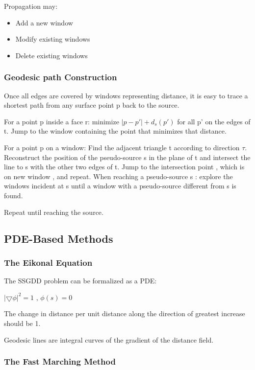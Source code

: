 \documentclass{article}
\begin{document}
Propagation may:

\begin{itemize}
    \item Add a new window
    \item Modify existing windows
    \item Delete existing windows
\end{itemize}

\subsubsection{Geodesic path Construction}

Once all edges are covered by windows representing distance, it is easy to trace a shortest path from any surface point p back to the source.

For a point p inside a face r: minimize $|p-p'| + d_s(p') $ for all p' on the edges of t. Jump to the window containing the point that minimizes that distance.

For a point p on a window: Find the adjacent triangle t according to direction $\tau$. Reconstruct the position of the pseudo-source s in the plane of t and intersect the line to s with the other two edges of t. Jump to the intersection point , which is on new window , and repeat.
When reaching a pseudo-source s : explore the windows incident at s until a window with a pseudo-source different from s is found.

Repeat until reaching the source.

\subsection{PDE-Based Methods}

\subsubsection{The Eikonal Equation}

The SSGDD problem can be formalized as a PDE:

$|\bigtriangledown \phi|^2 = 1$ , $\phi(s) = 0$

The change in distance per unit distance along the direction of greatest increase should be 1.

Geodesic lines are integral curves of the gradient of the distance field.

\subsubsection{The Fast Marching Method}
\end{document}
